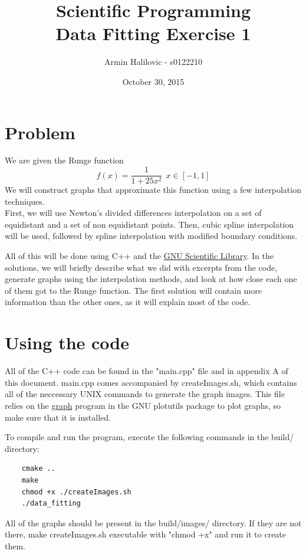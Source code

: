 \documentclass[11pt, a4paper, titlepage, openright]{article}
\title{\LARGE Scientific Programming \\ \normalsize Data Fitting Exercise 1}
\author{Armin Halilovic - s0122210}
\date{October 30, 2015}
\begin{document}

\onecolumn
\tableofcontents
\newpage



\section{Problem}
    We are given the Runge function  \[f(x) = \frac{1}{1 + 25 x^{2}} \ \ x \in [-1, 1] \]
    We will construct graphs that approximate this function using a few interpolation techniques. \\
    First, we will use Newton's divided differences interpolation on a set of equidistant and a set of non equidistant points.
    Then, cubic spline interpolation will be used, followed by spline interpolation with modified boundary conditions.

    All of this will be done using C++ and the \href{http://www.gnu.org/software/gsl/}{GNU Scientific Library}.
    In the solutions, we will briefly describe what we did with excerpts from the code, generate graphs using the interpolation methods,
    and look at how close each one of them got to the Runge function. The first solution will contain more information than
    the other ones, as it will explain most of the code.

\section{Using the code}
    All of the C++ code can be found in the "main.cpp" file and in appendix A of this document.
    main.cpp comes accompanied by createImages.sh, which contains all of the neccessary UNIX commands to generate the graph images.
    This file relies on the \href{https://www.gnu.org/software/plotutils/manual/en/html_node/graph.html}{graph} program
    in the GNU plotutils package to plot graphs, so make sure that it is installed.

    To compile and run the program, execute the following commands in the build/ directory:
    \begin{lstlisting}
    cmake ..
    make
    chmod +x ./createImages.sh
    ./data_fitting
    \end{lstlisting}
    All of the graphs should be present in the build/images/ directory. If they are not there, make createImages.sh executable
    with "chmod +x" and run it to create them.

\newpage
\end{document}
